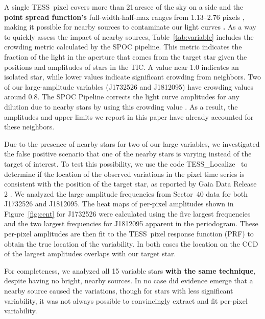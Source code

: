 \documentclass[twocolumn, linenumbers]{aastex631}
\newcommand{\tess}{TESS}
\newcommand{\tesslocalize}{{{\fontfamily{lmtt}\selectfont
\newcommand{\Msun}      {\>{\rm M_{\odot}}}
TESS\_Localize}}}
\begin{document}
A single \tess\ pixel covers more than 21\,arcsec of the sky on a side and the \textbf{point spread function's} full-width-half-max ranges from 1.13--2.76 pixels \citep{oelkers2018}, making it possible for nearby sources to contaminate our light curves \textbf{\citep[such as that seen in exoplanet catalogs, see][]{Coughlin2014AJ}.} As a way to quickly assess the impact of nearby sources, Table~\ref{tab:variable} includes the crowding metric calculated by the SPOC pipeline.  This metric indicates the fraction of the light in the aperture that comes from the target star given the positions and amplitudes of stars in the TIC.  A value near 1.0 indicates an isolated star, while lower values indicate significant crowding from neighbors.  Two of our large-amplitude variables (J1732526 and J1812095) have crowding values around 0.8.  The SPOC Pipeline corrects the light curve amplitudes for any dilution due to nearby stars by using this crowding value \citep{FausnaughDRN}.  As a result, the amplitudes and upper limits we report in this paper have already accounted for these neighbors.


Due to the presence of nearby stars for two of our large variables, we investigated the false positive scenario that one of the nearby stars is varying instead of the target of interest. To test this possibility, we use the code \tesslocalize\ \citep{HiggensBell} to determine if the location of the observed variations in the pixel time series is consistent with the position of the target star, as reported by Gaia Data Release 2 \citep{gaiaDR22018}.  We analyzed the large amplitude frequencies from Sector~40 data for both J1732526 and J1812095. The heat maps of per-pixel amplitudes shown in Figure~\ref{fig:cent} for J1732526 were calculated using the five largest frequencies and the two largest frequencies for J1812095 apparent in the periodogram.  These per-pixel amplitudes are then fit to the \tess\ pixel response function (PRF) to obtain the true location of the variability. In both cases the location on the CCD of the largest amplitudes overlaps with our target star. 

For completeness, we analyzed all 15 variable stars \textbf{with the same technique}, despite having no bright, nearby sources. In no case did evidence emerge that a nearby source caused the variations, though for stars with less significant variability, it was not always possible to convincingly extract and fit per-pixel variability. 
\end{document}
